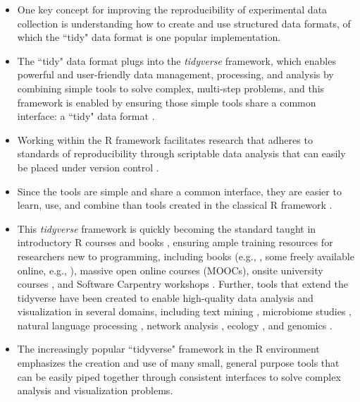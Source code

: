\documentclass[pdftex,english,11pt,parskip=half]{scrartcl}
\begin{document}
\begin{itemize}
\item One key concept for improving the reproducibility of experimental data collection is understanding how to create and use structured data formats, of which the ``tidy" data format is one popular implementation. 
\item The ``tidy" data
format plugs into the \textit{tidyverse} framework, which enables powerful and
user-friendly data management, processing, and analysis by combining simple
tools to solve complex, multi-step problems, and this framework is enabled by
ensuring those simple tools share a common interface: a ``tidy" data format
\cite{ross2017declutter, silge2016tidytext, wickham2016ggplot2, wickham2016r}.
\item Working within the R framework facilitates research that adheres to standards of
reproducibility through scriptable data analysis that can easily be placed under
version control \cite{bryan2018excuse}. 
\item Since the tools are simple and share a
common interface, they are easier to learn, use, and combine than tools created
in the classical R framework \cite{ross2017declutter, lowndes2017our,
reviewer2017review, mcnamara2016state}. 
\item This \textit{tidyverse} framework is
quickly becoming the standard taught in introductory R courses and books
\cite{hicks2017guide, baumer2015data, kaplan2017teaching, stander2017enthusing,
reviewer2017review, mcnamara2016state}, ensuring ample training resources for
researchers new to programming, including books (e.g., \cite{baumer2017modern,
lifesciencesR}, some freely available online, e.g., \cite{wickham2016r}),
massive open online courses (MOOCs), onsite university courses
\cite{baumer2015data, kaplan2017teaching, stander2017enthusing}, and Software
Carpentry workshops \cite{wilson2014software, pawlik2017developing}. Further,
tools that extend the tidyverse have been created to enable high-quality data
analysis and visualization in several domains, including text mining
\cite{silge2017text}, microbiome studies \cite{mcmurdie2013phyloseq}, natural
language processing \cite{RJ-2017-035}, network analysis \cite{RJ-2017-023},
ecology \cite{hsieh2016inext}, and genomics \cite{yin2012ggbio}. 
\item The increasingly popular ``tidyverse" framework in the R environment emphasizes the creation and use of many small, general purpose tools that can be easily piped together through consistent interfaces to solve complex analysis and visualization problems. 

\end{itemize}
\end{document}
